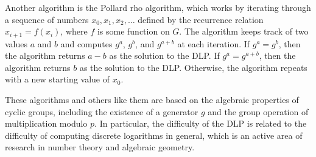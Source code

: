 \documentclass[12pt,openany]{book}
\theoremstyle{definition}
\begin{document}
	Another algorithm is the Pollard rho algorithm, which works by iterating through a sequence of numbers $x_0, x_1, x_2, \ldots$ defined by the recurrence relation $x_{i+1} = f(x_i)$, where $f$ is some function on $G$. The algorithm keeps track of two values $a$ and $b$ and computes $g^a$, $g^b$, and $g^{a+b}$ at each iteration. If $g^a = g^b$, then the algorithm returns $a-b$ as the solution to the DLP. If $g^a = g^{a+b}$, then the algorithm returns $b$ as the solution to the DLP. Otherwise, the algorithm repeats with a new starting value of $x_0$.
	
	These algorithms and others like them are based on the algebraic properties of cyclic groups, including the existence of a generator $g$ and the group operation of multiplication modulo $p$. In particular, the difficulty of the DLP is related to the difficulty of computing discrete logarithms in general, which is an active area of research in number theory and algebraic geometry.
	
	\begin{tcolorbox}[colback=white,colframe=lemcolor,arc=5pt,title={\color{white}\bf }]
		
	\end{tcolorbox}
	\begin{tcolorbox}[colback=white,colframe=lemcolor,arc=5pt,title={\color{white}\bf }]
		
	\end{tcolorbox}
	\begin{tcolorbox}[colback=white,colframe=lemcolor,arc=5pt,title={\color{white}\bf }]
		
	\end{tcolorbox}
\end{document}
